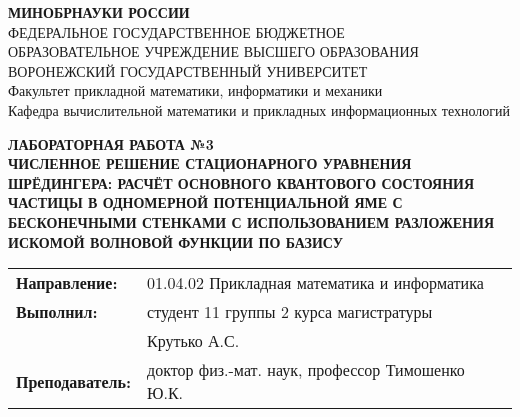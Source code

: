 \documentclass[a4paper,12pt]{article}
\begin{document}

\lstset{style=pythonStyle}

\pagestyle{empty}

\begin{center}
\textbf{МИНОБРНАУКИ РОССИИ}\\
ФЕДЕРАЛЬНОЕ ГОСУДАРСТВЕННОЕ БЮДЖЕТНОЕ \\
ОБРАЗОВАТЕЛЬНОЕ УЧРЕЖДЕНИЕ ВЫСШЕГО ОБРАЗОВАНИЯ \\
ВОРОНЕЖСКИЙ ГОСУДАРСТВЕННЫЙ УНИВЕРСИТЕТ \\
Факультет прикладной математики, информатики и механики\\
Кафедра вычислительной математики и прикладных информационных технологий
\end{center}

\vspace{2cm}
\begin{center}
\textbf{ЛАБОРАТОРНАЯ РАБОТА №3}\\
\textbf{ЧИСЛЕННОЕ РЕШЕНИЕ СТАЦИОНАРНОГО УРАВНЕНИЯ ШРЁДИНГЕРА: РАСЧЁТ ОСНОВНОГО КВАНТОВОГО СОСТОЯНИЯ ЧАСТИЦЫ В ОДНОМЕРНОЙ ПОТЕНЦИАЛЬНОЙ ЯМЕ С БЕСКОНЕЧНЫМИ СТЕНКАМИ С ИСПОЛЬЗОВАНИЕМ РАЗЛОЖЕНИЯ ИСКОМОЙ ВОЛНОВОЙ ФУНКЦИИ ПО БАЗИСУ}
\end{center}

\vspace{3cm}
\begin{flushright}
\begin{tabular}{l l}
\textbf{Направление:} & 01.04.02 \textendash{} Прикладная математика и информатика \\
\textbf{Выполнил:} & студент 11 группы 2 курса магистратуры \\
& Крутько А.С. \\
\textbf{Преподаватель:} & доктор физ.-мат. наук, профессор Тимошенко Ю.К.
\end{tabular}
\end{flushright}
\end{document}
